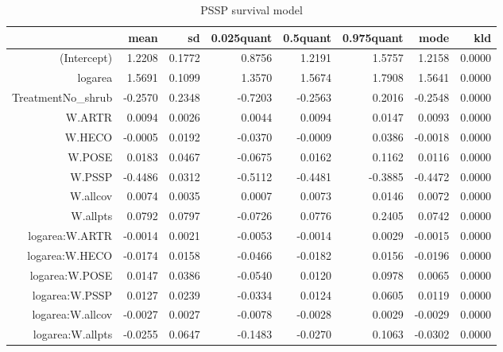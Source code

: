 \begin{table}[ht]
\centering
\begin{tabular}{rrrrrrrr}
  \hline
 & mean & sd & 0.025quant & 0.5quant & 0.975quant & mode & kld \\ 
  \hline
(Intercept) & 1.2208 & 0.1772 & 0.8756 & 1.2191 & 1.5757 & 1.2158 & 0.0000 \\ 
  logarea & 1.5691 & 0.1099 & 1.3570 & 1.5674 & 1.7908 & 1.5641 & 0.0000 \\ 
  TreatmentNo\_shrub & -0.2570 & 0.2348 & -0.7203 & -0.2563 & 0.2016 & -0.2548 & 0.0000 \\ 
  W.ARTR & 0.0094 & 0.0026 & 0.0044 & 0.0094 & 0.0147 & 0.0093 & 0.0000 \\ 
  W.HECO & -0.0005 & 0.0192 & -0.0370 & -0.0009 & 0.0386 & -0.0018 & 0.0000 \\ 
  W.POSE & 0.0183 & 0.0467 & -0.0675 & 0.0162 & 0.1162 & 0.0116 & 0.0000 \\ 
  W.PSSP & -0.4486 & 0.0312 & -0.5112 & -0.4481 & -0.3885 & -0.4472 & 0.0000 \\ 
  W.allcov & 0.0074 & 0.0035 & 0.0007 & 0.0073 & 0.0146 & 0.0072 & 0.0000 \\ 
  W.allpts & 0.0792 & 0.0797 & -0.0726 & 0.0776 & 0.2405 & 0.0742 & 0.0000 \\ 
  logarea:W.ARTR & -0.0014 & 0.0021 & -0.0053 & -0.0014 & 0.0029 & -0.0015 & 0.0000 \\ 
  logarea:W.HECO & -0.0174 & 0.0158 & -0.0466 & -0.0182 & 0.0156 & -0.0196 & 0.0000 \\ 
  logarea:W.POSE & 0.0147 & 0.0386 & -0.0540 & 0.0120 & 0.0978 & 0.0065 & 0.0000 \\ 
  logarea:W.PSSP & 0.0127 & 0.0239 & -0.0334 & 0.0124 & 0.0605 & 0.0119 & 0.0000 \\ 
  logarea:W.allcov & -0.0027 & 0.0027 & -0.0078 & -0.0028 & 0.0029 & -0.0029 & 0.0000 \\ 
  logarea:W.allpts & -0.0255 & 0.0647 & -0.1483 & -0.0270 & 0.1063 & -0.0302 & 0.0000 \\ 
   \hline
\end{tabular}
\caption{PSSP survival model} 
\label{PSSPsurvival}
\end{table}
